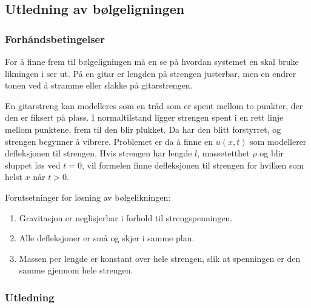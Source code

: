\subsection{Utledning av bølgeligningen}
\subsubsection{Forhåndsbetingelser}
For å finne frem til bølgeligningen må en se på hvordan systemet en skal bruke likningen i ser ut.
På en gitar er lengden på strengen justerbar, men en endrer tonen ved å stramme eller slakke
på gitarstrengen.

En gitarstreng kan modelleres som en tråd som er spent mellom to punkter, der den er fiksert på plass.
I normaltilstand ligger strengen spent i en rett linje mellom punktene, frem til den blir plukket. Da
har den blitt forstyrret, og strengen begynner å vibrere. Problemet er da å finne en \(u(x,t)\) som modellerer
defleksjonen til strengen. Hvis strengen har lengde \(l\), massetetthet \(\rho\) og blir sluppet løs ved \(t=0\),
vil formelen finne defleksjonen til strengen for hvilken som helst \(x\) når \(t>0\).

Forutsetninger for løsning av bølgelikningen:

\begin{enumerate}
  \item Gravitasjon er neglisjerbar i forhold til strengspenningen.
  \item Alle defleksjoner er små og skjer i samme plan.
  \item Massen per lengde er konstant over hele strengen, slik at spenningen er den samme
  gjennom hele strengen.
\end{enumerate}

\subsubsection{Utledning}

